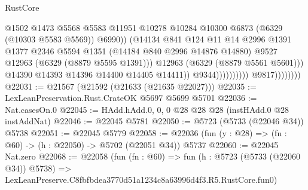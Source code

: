 \begin{lexlean}{RustCore}
\begin{coremodule}
                                                  @1502
                                                  @1473
                                                  @5568
                                                  @5583
                                                  @11951
                                                  @10278
                                                  @10284
                                                  @10300
                                                  @6873
                                                  (@6329 (@10303 @5583 @5569))
                                                  @6990))
                                              (@14134
                                                @841
                                                @124
                                                @11
                                                @14
                                                @2996
                                                @1391
                                                @1377
                                                @2346
                                                @5594
                                                @1351
                                                (@14184 @840 @2996 @14876 @14880)
                                                @9527
                                                @12963
                                                (@6329 (@8879 @5595 @1391)))
                                              @12963
                                              (@6329 (@8879 @5561 @5601)))
                                            @14390
                                            @14393
                                            @14396
                                            @14400
                                            @14405
                                            @14411))
                                        @9344))))))))))
                    @9817))))))))
@22031 := @21567 (@21592 (@21633 (@21635 @22027)))
@22035 := LexLeanPreservation.Rust.CrateOK @5697 @5699 @5701
@22036 := Nat.casesOn.{0}
@22045 := HAdd.hAdd.{0, 0, 0} @28 @28 @28 (instHAdd.{0} @28 instAddNat)
@22046 := @22045 @5781
@22050 := @5723 (@5733 (@22046 @34)) @5738
@22051 := @22045 @5779
@22058 := @22036 (fun (y : @28) => (fn : @60) -> (h : @22050) -> @5702 (@22051 @34)) @5737
@22060 := @22045 Nat.zero
@22068 := @22058
    (fun (fn : @60) =>
    fun (h : @5723 (@5733 (@22060 @34)) @5738) =>
    LexLeanPreserve.C8fbfbdea3770d51a1234c8a63996d4f3.R5.RustCore.fun0)

\end{coremodule}
\end{lexlean}

